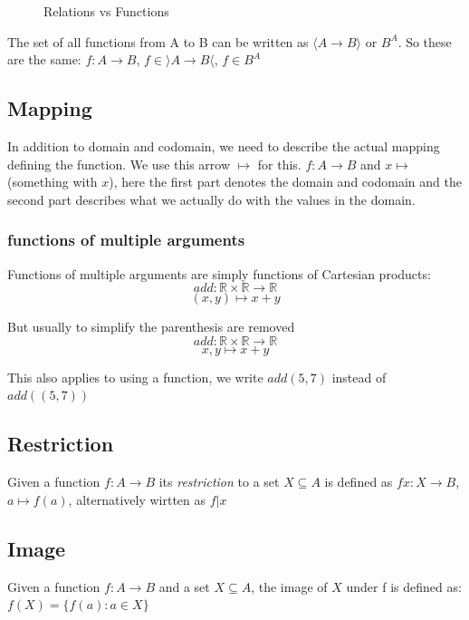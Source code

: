\documentclass[12pt]{article} %
\def\R{\mathbb{R}}
\begin{document}
\begin{figure}[H]
\caption{Relations vs Functions}
\label{Relations vs Functions}
\end{figure}

The set of all functions from A to B can be written as $\langle A \rightarrow B \rangle$ or $B^A$. So these are the same: $f: A \rightarrow B$, $f \in \rangle A \rightarrow B \langle$, $f \in B^A$

\subsection{Mapping}
In addition to domain and codomain, we need to describe the actual mapping defining the function. We use this arrow $\mapsto$ for this. $f: A \rightarrow B$ and $x \mapsto$ (something with $x$), here the first part denotes the domain and codomain and the second part describes what we actually do with the values in the domain.

\subsubsection{functions of multiple arguments}
Functions of multiple arguments are simply functions of Cartesian products:
\[
    add: \R \times \R \rightarrow \R
\]
\[
    (x,y) \mapsto x + y
\]

But usually to simplify the parenthesis are removed 
\[
    add: \R \times \R \rightarrow \R
\]
\[
    x,y \mapsto x + y
\]

This also applies to using a function, we write $add(5,7)$ instead of $add((5,7))$

\subsection{Restriction}
Given a function $f: A \to B$ its \textit{restriction} to a set $X \subseteq A$ is defined as $fx: X \to B$, $a \mapsto f(a)$, alternatively wirtten as $f | x$

\subsection{Image}
Given a function $f: A \to B$ and a set $X \subseteq A$, the image of $X$ under f is defined as: $f(X) = \{f(a): a \in X\}$
\end{document}
